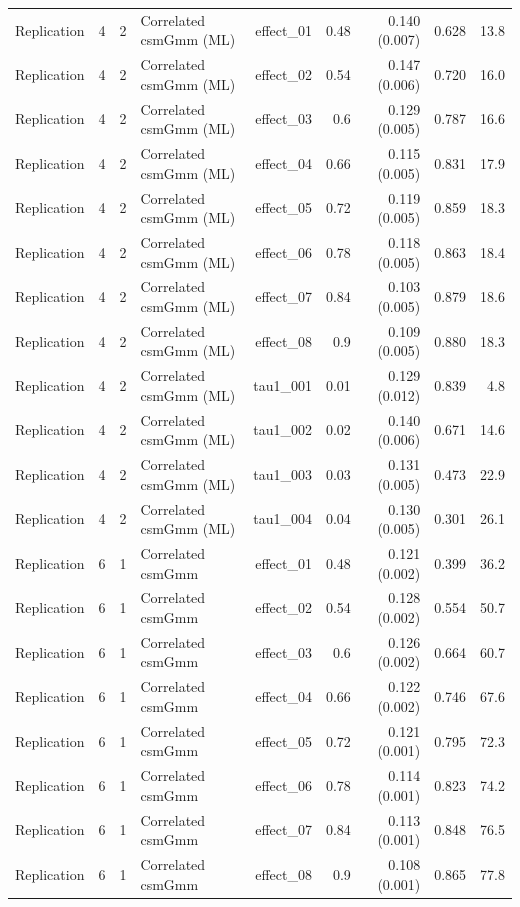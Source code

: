\begin{longtable}{lcclrrrrr}
Replication & 4 & 2 & Correlated csmGmm (ML) & effect\_01 & 0.48 & 0.140 (0.007) & 0.628 & 13.8\\
Replication & 4 & 2 & Correlated csmGmm (ML) & effect\_02 & 0.54 & 0.147 (0.006) & 0.720 & 16.0\\
Replication & 4 & 2 & Correlated csmGmm (ML) & effect\_03 & 0.6 & 0.129 (0.005) & 0.787 & 16.6\\
Replication & 4 & 2 & Correlated csmGmm (ML) & effect\_04 & 0.66 & 0.115 (0.005) & 0.831 & 17.9\\
Replication & 4 & 2 & Correlated csmGmm (ML) & effect\_05 & 0.72 & 0.119 (0.005) & 0.859 & 18.3\\
Replication & 4 & 2 & Correlated csmGmm (ML) & effect\_06 & 0.78 & 0.118 (0.005) & 0.863 & 18.4\\
Replication & 4 & 2 & Correlated csmGmm (ML) & effect\_07 & 0.84 & 0.103 (0.005) & 0.879 & 18.6\\
Replication & 4 & 2 & Correlated csmGmm (ML) & effect\_08 & 0.9 & 0.109 (0.005) & 0.880 & 18.3\\
Replication & 4 & 2 & Correlated csmGmm (ML) & tau1\_001 & 0.01 & 0.129 (0.012) & 0.839 & 4.8\\
Replication & 4 & 2 & Correlated csmGmm (ML) & tau1\_002 & 0.02 & 0.140 (0.006) & 0.671 & 14.6\\
Replication & 4 & 2 & Correlated csmGmm (ML) & tau1\_003 & 0.03 & 0.131 (0.005) & 0.473 & 22.9\\
Replication & 4 & 2 & Correlated csmGmm (ML) & tau1\_004 & 0.04 & 0.130 (0.005) & 0.301 & 26.1\\
Replication & 6 & 1 & Correlated csmGmm & effect\_01 & 0.48 & 0.121 (0.002) & 0.399 & 36.2\\
Replication & 6 & 1 & Correlated csmGmm & effect\_02 & 0.54 & 0.128 (0.002) & 0.554 & 50.7\\
Replication & 6 & 1 & Correlated csmGmm & effect\_03 & 0.6 & 0.126 (0.002) & 0.664 & 60.7\\
Replication & 6 & 1 & Correlated csmGmm & effect\_04 & 0.66 & 0.122 (0.002) & 0.746 & 67.6\\
Replication & 6 & 1 & Correlated csmGmm & effect\_05 & 0.72 & 0.121 (0.001) & 0.795 & 72.3\\
Replication & 6 & 1 & Correlated csmGmm & effect\_06 & 0.78 & 0.114 (0.001) & 0.823 & 74.2\\
Replication & 6 & 1 & Correlated csmGmm & effect\_07 & 0.84 & 0.113 (0.001) & 0.848 & 76.5\\
Replication & 6 & 1 & Correlated csmGmm & effect\_08 & 0.9 & 0.108 (0.001) & 0.865 & 77.8\\

\end{longtable}
